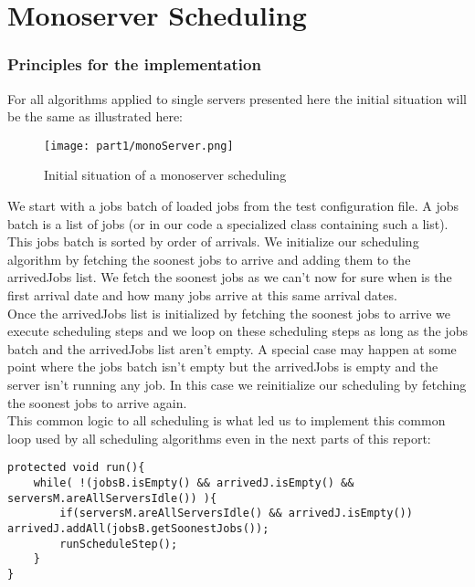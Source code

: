\documentclass[./report.tex]{subfiles}
\begin{document}
\part{Monoserver Scheduling}

\section{Principles for the implementation}
\label{sec:principles}

For all algorithms applied to single servers presented here the initial situation will be the same as illustrated here:
\begin{figure}[!h]
	\center
	\texttt{[image: part1/monoServer.png]}
	\caption{Initial situation of a monoserver scheduling}
	\label{fig:monoServer_init} 
\end{figure}

We start with a jobs batch of loaded jobs from the test configuration file. A jobs batch is a list of jobs (or in our code a specialized class containing such a list). This jobs batch is sorted by order of arrivals. We initialize our scheduling algorithm by fetching the soonest jobs to arrive and adding them to the arrivedJobs list. We fetch the soonest jobs as we can't now for sure when is the first arrival date and how many jobs arrive at this same arrival dates.\\

Once the arrivedJobs list is initialized by fetching the soonest jobs to arrive we execute scheduling steps and we loop on these scheduling steps as long as the jobs batch and the arrivedJobs list aren't empty. A special case may happen at some point where the jobs batch isn't empty but the arrivedJobs is empty and the server isn't running any job. In this case we reinitialize our scheduling by fetching the soonest jobs to arrive again.\\

This common logic to all scheduling is what led us to implement this common loop used by all scheduling algorithms even in the next parts of this report:

\begin{lstlisting}[style=Java, caption={Main scheduling loop in Scheduler abstract class (cf. run() method)}]
protected void run(){
	while( !(jobsB.isEmpty() && arrivedJ.isEmpty() && serversM.areAllServersIdle()) ){
		if(serversM.areAllServersIdle() && arrivedJ.isEmpty()) arrivedJ.addAll(jobsB.getSoonestJobs());
		runScheduleStep();
	}
}
\end{lstlisting}
\end{document}
